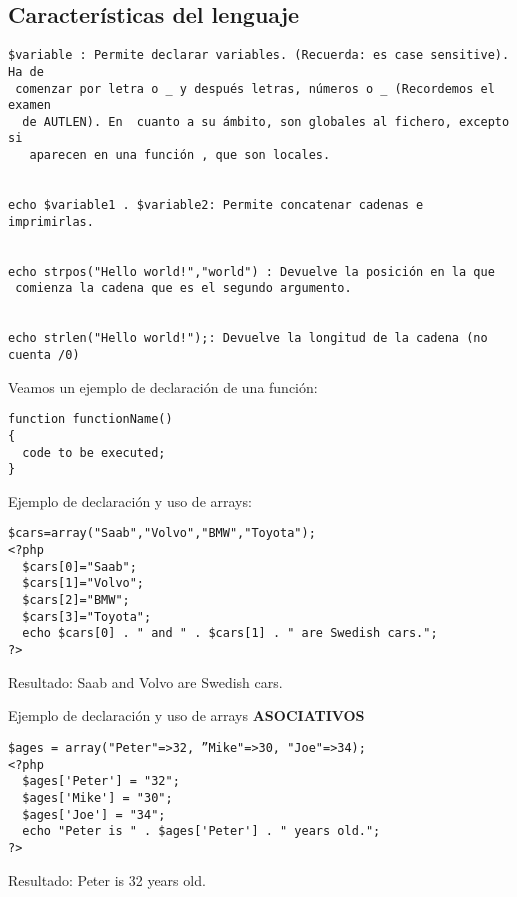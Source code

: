 \documentclass{apuntes}
\begin{document}
\subsection{Características del lenguaje}

\begin{verbatim}
$variable : Permite declarar variables. (Recuerda: es case sensitive). Ha de
 comenzar por letra o _ y después letras, números o _ (Recordemos el examen
  de AUTLEN). En  cuanto a su ámbito, son globales al fichero, excepto si
   aparecen en una función , que son locales.


echo $variable1 . $variable2: Permite concatenar cadenas e imprimirlas.


echo strpos("Hello world!","world") : Devuelve la posición en la que
 comienza la cadena que es el segundo argumento.


echo strlen("Hello world!");: Devuelve la longitud de la cadena (no cuenta /0)
\end{verbatim}



Veamos un ejemplo de declaración de una función:
\begin{verbatim}
function functionName()
{
  code to be executed;
}
\end{verbatim}

Ejemplo de declaración y uso de arrays:
\begin{verbatim}
$cars=array("Saab","Volvo","BMW","Toyota");
<?php
  $cars[0]="Saab";
  $cars[1]="Volvo";
  $cars[2]="BMW";
  $cars[3]="Toyota";
  echo $cars[0] . " and " . $cars[1] . " are Swedish cars.";
?>
\end{verbatim}
Resultado: Saab and Volvo are Swedish cars.

Ejemplo de declaración y uso de arrays \textbf{ASOCIATIVOS}
\begin{verbatim}
$ages = array("Peter"=>32, ”Mike"=>30, "Joe"=>34);
<?php
  $ages['Peter'] = "32";
  $ages['Mike'] = "30";
  $ages['Joe'] = "34";
  echo "Peter is " . $ages['Peter'] . " years old.";
?>
\end{verbatim}
Resultado: Peter is 32 years old.
\end{document}
